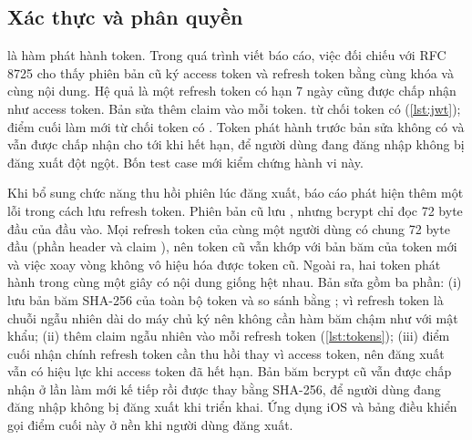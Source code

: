 \subsection{Xác thực và phân quyền}\label{sec:impl-auth}

 là hàm phát hành token. Trong quá trình viết báo cáo, việc đối chiếu với RFC 8725 \cite{rfc8725} cho thấy phiên bản cũ ký access token và refresh token bằng cùng khóa và cùng nội dung. Hệ quả là một refresh token có hạn 7 ngày cũng được  chấp nhận như access token. Bản sửa thêm claim  vào mỗi token.  từ chối token có  (\cref{lst:jwt}); điểm cuối làm mới từ chối token có . Token phát hành trước bản sửa không có  và vẫn được chấp nhận cho tới khi hết hạn, để người dùng đang đăng nhập không bị đăng xuất đột ngột. Bốn test case mới kiểm chứng hành vi này.

Khi bổ sung chức năng thu hồi phiên lúc đăng xuất, báo cáo phát hiện thêm một lỗi trong cách lưu refresh token. Phiên bản cũ lưu , nhưng bcrypt chỉ đọc 72 byte đầu của đầu vào. Mọi refresh token của cùng một người dùng có chung 72 byte đầu (phần header và claim ), nên token cũ vẫn khớp với bản băm của token mới và việc xoay vòng không vô hiệu hóa được token cũ. Ngoài ra, hai token phát hành trong cùng một giây có nội dung giống hệt nhau. Bản sửa gồm ba phần: (i) lưu bản băm SHA-256 của toàn bộ token và so sánh bằng ; vì refresh token là chuỗi ngẫu nhiên dài do máy chủ ký nên không cần hàm băm chậm như với mật khẩu; (ii) thêm claim  ngẫu nhiên vào mỗi refresh token (\cref{lst:tokens}); (iii) điểm cuối  nhận chính refresh token cần thu hồi thay vì access token, nên đăng xuất vẫn có hiệu lực khi access token đã hết hạn. Bản băm bcrypt cũ vẫn được chấp nhận ở lần làm mới kế tiếp rồi được thay bằng SHA-256, để người dùng đang đăng nhập không bị đăng xuất khi triển khai. Ứng dụng iOS và bảng điều khiển gọi điểm cuối này ở nền khi người dùng đăng xuất.





